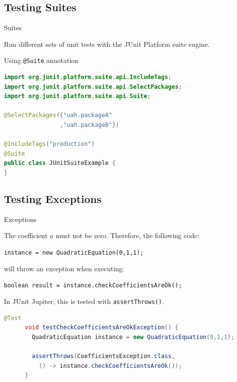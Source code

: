 \documentclass[11pt, xcolor=svgnames]{beamer}
\begin{document}
\subsection{Testing Suites}


\begin{frame}[fragile]{Suites}

Run different sets of unit tests with the JUnit Platform suite engine.

Using \texttt{@Suite} annotation

\begin{lstlisting}[language=Java,basicstyle=\scriptsize]  
import org.junit.platform.suite.api.IncludeTags;
import org.junit.platform.suite.api.SelectPackages;
import org.junit.platform.suite.api.Suite;

@SelectPackages({"uah.packageA"
                ,"uah.packageB"})

@IncludeTags("production")
@Suite
public class JUnitSuiteExample {
}
\end{lstlisting}

\end{frame}




\subsection{Testing Exceptions}



\begin{frame}[fragile]{Exceptions}

  The coefficient $a$ must not be zero. Therefore, the following code:
  
  \texttt{instance = new QuadraticEquation(0,1,1);}
  
  will throw an exception when executing:
  
  \texttt{boolean result = instance.checkCoefficientsAreOk();}
  
    In JUnit Jupiter, this is tested with \texttt{assertThrows()}.
  
  \begin{lstlisting}[language=JAVA,basicstyle=\scriptsize]
      @Test
      void testCheckCoefficientsAreOkException() {
        QuadraticEquation instance = new QuadraticEquation(0,1,1);

        assertThrows(CoefficientsException.class,
          () -> instance.checkCoefficientsAreOk());
      }
  \end{lstlisting}
  
  \end{frame}
\end{document}
